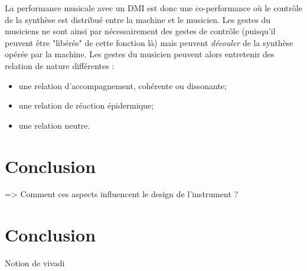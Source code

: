  La performance musicale avec un DMI est donc une co-performance où le contrôle de la synthèse est distribué entre la machine et le musicien. 
 Les gestes du musiciens ne sont ainsi par nécessairement des gestes de contrôle (puisqu'il peuvent être "libérés" de cette fonction là) mais peuvent \textit{découler} de la synthèse opérée par la machine. Les gestes du musicien peuvent alors entretenir des relation de nature différentes :

\vspace{-1em}
\begin{itemize}[noitemsep]
\item une relation d'accompagnement, cohérente ou dissonante;
\item une relation de réaction épidermique;
\item une relation neutre.
\end{itemize}
 


 
\section{Conclusion}
\label{sec:transparency:conclusion}
=> Comment ces aspects influencent le design de l’instrument ?

\section*{Conclusion}
Notion de vivadi

